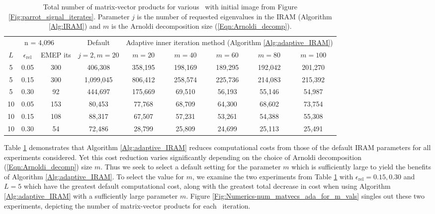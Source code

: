 \begin{enumerate}
\begin{table}[H]
\centering
\begin{tabular}{ |ccc|c|ccccc| }
 \hline
			  \multicolumn{3}{|c|}{n = 4,096} &  Default
			&  \multicolumn{5}{c|}{Adaptive inner iteration method (Algorithm \ref{Alg:adaptive_IRAM})}	\\
$L$ & $\epsilon_\text{rel}$ & EMEP its & $j=2, m=20$	& $m=20$  & $m=40$  & $m=60$  & $m=80$  & $m=100$   \\
 \hline
  5 &  0.05 & 300 &  406,308  &  358,195  &  198,169  &  189,295  &  192,042  &  201,270  \\ 
  5 &  0.15 & 300 & 1,099,045  &  806,412  &  258,574  &  225,736  &  214,083  &  215,392  \\ 
  5 &  0.30 &  92 &  444,697  &  175,669  &   69,510  &   56,193  &   55,146  &   54,987  \\ 
 10 &  0.05 & 153 &   80,453  &   77,768  &   68,709  &   64,300  &   68,602  &   73,754  \\ 
 10 &  0.15 & 108 &   88,317  &   67,507  &   57,231  &   53,261  &   54,388  &   55,308  \\ 
 10 &  0.30 &  54 &   72,486  &   28,799  &   25,809  &   24,699  &   25,113  &   25,491  \\ 
 \hline
\end{tabular}

\caption{Total number of matrix-vector products for various \emeps \ with initial image from Figure \ref{Fig:parrot_signal_iterates}.  Parameter $j$ is the number of requested eigenvalues in the IRAM (Algorithm \ref{Alg:IRAM}) and $m$ is the Arnoldi decomposition size (\ref{Eqn:Arnoldi_decomp}).} \label{Tab:Numerics-num_matvecs_orig_vs_ada}
\end{table}


Table \ref{Tab:Numerics-num_matvecs_orig_vs_ada} demonstrates that Algorithm \ref{Alg:adaptive_IRAM} reduces computational costs from those of the default IRAM parameters for all experiments considered.
Yet this cost reduction varies significantly depending on the choice of Arnoldi decomposition (\ref{Eqn:Arnoldi_decomp}) size $m$.
Thus we seek to select a default setting for the parameter $m$ which is sufficiently large to yield the benefits of Algorithm \ref{Alg:adaptive_IRAM}.
To select the value for $m$, we examine the two experiments from Table \ref{Tab:Numerics-num_matvecs_orig_vs_ada} with $\epsilon_\text{rel} = 0.15, 0.30$ and $L=5$ which have the greatest default computational cost, along with the greatest total decrease in cost when using Algorithm \ref{Alg:adaptive_IRAM} with a sufficiently large parameter $m$.
Figure \ref{Fig:Numerics-num_matvecs_ada_for_m_vals} singles out these two experiments, depicting the number of matrix-vector products for each \emep \ iteration.


\end{enumerate}
